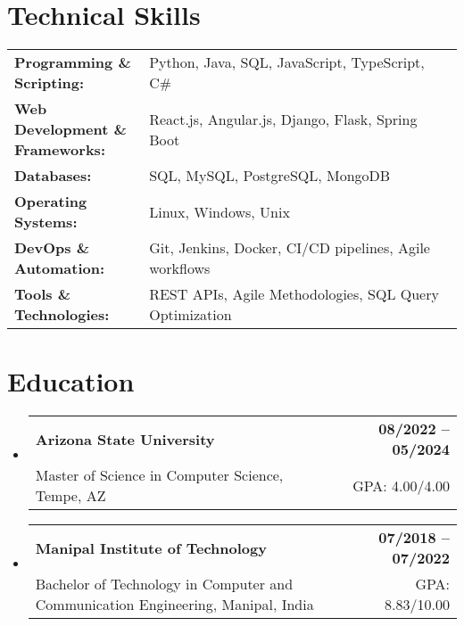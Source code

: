 \documentclass[letterpaper,11pt]{article}
\makeatletter
\newcommand{\educationSubheading}[4]{
  \vspace{-2pt}\item
    \begin{tabular*}{1.0\textwidth}[t]{l@{\extracolsep{\fill}}r}
      \textbf{\small #1} & \textbf{\small #2} \\
      {\small#3} & {\small #4} \\
    \end{tabular*}\vspace{-7pt}
}
\newcommand{\resumeSubHeadingListStart}{\begin{itemize}[leftmargin=0pt, label={}]}
\newcommand{\resumeSubHeadingListEnd}{\end{itemize}}
\makeatother
\begin{document}
\section{Technical Skills}
        \vspace{-14pt}
        \begin{table}[h]
            \footnotesize
            \begin{tabular}{p{0.3\linewidth} p{0.7\linewidth}}
                \textbf{Programming \& Scripting:} & Python, Java, SQL, JavaScript, TypeScript, C\# \\
                \textbf{Web Development \& Frameworks:} & React.js, Angular.js, Django, Flask, Spring Boot \\
                \textbf{Databases:} & SQL, MySQL, PostgreSQL, MongoDB \\
                \textbf{Operating Systems:} & Linux, Windows, Unix \\
                \textbf{DevOps \& Automation:} & Git, Jenkins, Docker, CI/CD pipelines, Agile workflows \\
                \textbf{Tools \& Technologies:} & REST APIs, Agile Methodologies, SQL Query Optimization \\
            \end{tabular}
        \end{table}

 \vspace{-15pt}

\section{Education}
  \resumeSubHeadingListStart
    \educationSubheading
      {Arizona State University}{08/2022 -- 05/2024}
      {Master of Science in Computer Science, Tempe, AZ}{GPA: 4.00/4.00}

    \educationSubheading
      {Manipal Institute of Technology}{07/2018 -- 07/2022}
      {Bachelor of Technology in Computer and Communication Engineering, Manipal, India}{GPA: 8.83/10.00}
  \resumeSubHeadingListEnd
\end{document}

